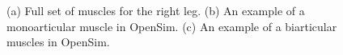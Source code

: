 \documentclass[runningheads]{llncs}
\begin{document}
\begin{figure}[!ht]
    \hfill
    \hfill
    \caption{(a) Full set of muscles for the right leg. (b) An example of a monoarticular muscle in OpenSim. (c) An example of a biarticular muscles in OpenSim.}
    \label{musclesOpenSim}
\end{figure}
\end{document}
